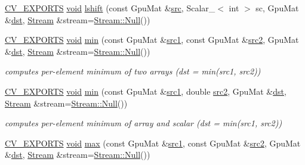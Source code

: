 \begin{DoxyCompactItemize}
\item 
\hyperlink{core_2types__c_8h_a1bf9f0e121b54272da02379cfccd0a2b}{C\-V\-\_\-\-E\-X\-P\-O\-R\-T\-S} \hyperlink{legacy_8hpp_a8bb47f092d473522721002c86c13b94e}{void} \hyperlink{namespacecv_1_1gpu_aa71657c88a0fd845d45a354a82100935}{lshift} (const Gpu\-Mat \&\hyperlink{legacy_8hpp_a371cd109b74033bc4366f584edd3dacc}{src}, Scalar\-\_\-$<$ int $>$ sc, Gpu\-Mat \&\hyperlink{photo__c_8h_aed13e2a25279b24dc954073233fef7a5}{dst}, \hyperlink{classcv_1_1gpu_1_1Stream}{Stream} \&stream=\hyperlink{classcv_1_1gpu_1_1Stream_af96c23564834f88333dcb8997df553f1}{Stream\-::\-Null}())
\item 
\hyperlink{core_2types__c_8h_a1bf9f0e121b54272da02379cfccd0a2b}{C\-V\-\_\-\-E\-X\-P\-O\-R\-T\-S} \hyperlink{legacy_8hpp_a8bb47f092d473522721002c86c13b94e}{void} \hyperlink{namespacecv_1_1gpu_a8d100341ab11a730a3c90b75d5890a8c}{min} (const Gpu\-Mat \&\hyperlink{core__c_8h_a897de4702c922f4cccda0d57ccdcafb3}{src1}, const Gpu\-Mat \&\hyperlink{core__c_8h_a7561a36d48069d54a6c8ac4e4750edfd}{src2}, Gpu\-Mat \&\hyperlink{photo__c_8h_aed13e2a25279b24dc954073233fef7a5}{dst}, \hyperlink{classcv_1_1gpu_1_1Stream}{Stream} \&stream=\hyperlink{classcv_1_1gpu_1_1Stream_af96c23564834f88333dcb8997df553f1}{Stream\-::\-Null}())
\begin{DoxyCompactList}\small\item\em computes per-\/element minimum of two arrays (dst = min(src1, src2)) \end{DoxyCompactList}\item 
\hyperlink{core_2types__c_8h_a1bf9f0e121b54272da02379cfccd0a2b}{C\-V\-\_\-\-E\-X\-P\-O\-R\-T\-S} \hyperlink{legacy_8hpp_a8bb47f092d473522721002c86c13b94e}{void} \hyperlink{namespacecv_1_1gpu_a3f253056491cb8693e470d3edc38afa9}{min} (const Gpu\-Mat \&\hyperlink{core__c_8h_a897de4702c922f4cccda0d57ccdcafb3}{src1}, double \hyperlink{core__c_8h_a7561a36d48069d54a6c8ac4e4750edfd}{src2}, Gpu\-Mat \&\hyperlink{photo__c_8h_aed13e2a25279b24dc954073233fef7a5}{dst}, \hyperlink{classcv_1_1gpu_1_1Stream}{Stream} \&stream=\hyperlink{classcv_1_1gpu_1_1Stream_af96c23564834f88333dcb8997df553f1}{Stream\-::\-Null}())
\begin{DoxyCompactList}\small\item\em computes per-\/element minimum of array and scalar (dst = min(src1, src2)) \end{DoxyCompactList}\item 
\hyperlink{core_2types__c_8h_a1bf9f0e121b54272da02379cfccd0a2b}{C\-V\-\_\-\-E\-X\-P\-O\-R\-T\-S} \hyperlink{legacy_8hpp_a8bb47f092d473522721002c86c13b94e}{void} \hyperlink{namespacecv_1_1gpu_a706c9def6816de566be2671b75ec5309}{max} (const Gpu\-Mat \&\hyperlink{core__c_8h_a897de4702c922f4cccda0d57ccdcafb3}{src1}, const Gpu\-Mat \&\hyperlink{core__c_8h_a7561a36d48069d54a6c8ac4e4750edfd}{src2}, Gpu\-Mat \&\hyperlink{photo__c_8h_aed13e2a25279b24dc954073233fef7a5}{dst}, \hyperlink{classcv_1_1gpu_1_1Stream}{Stream} \&stream=\hyperlink{classcv_1_1gpu_1_1Stream_af96c23564834f88333dcb8997df553f1}{Stream\-::\-Null}())

\end{DoxyCompactItemize}
